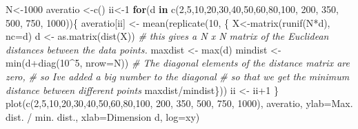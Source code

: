 \documentclass[
]{book}
\newenvironment{Shaded}{\begin{snugshade}}{\end{snugshade}}
\newcommand{\AttributeTok}[1]{\textcolor[rgb]{0.77,0.63,0.00}{#1}}
\newcommand{\CommentTok}[1]{\textcolor[rgb]{0.56,0.35,0.01}{\textit{#1}}}
\newcommand{\ControlFlowTok}[1]{\textcolor[rgb]{0.13,0.29,0.53}{\textbf{#1}}}
\newcommand{\DecValTok}[1]{\textcolor[rgb]{0.00,0.00,0.81}{#1}}
\newcommand{\FunctionTok}[1]{\textcolor[rgb]{0.00,0.00,0.00}{#1}}
\newcommand{\NormalTok}[1]{#1}
\newcommand{\OtherTok}[1]{\textcolor[rgb]{0.56,0.35,0.01}{#1}}
\newcommand{\SpecialCharTok}[1]{\textcolor[rgb]{0.00,0.00,0.00}{#1}}
\newcommand{\StringTok}[1]{\textcolor[rgb]{0.31,0.60,0.02}{#1}}
\theoremstyle{definition}
\theoremstyle{definition}
\theoremstyle{definition}
\theoremstyle{definition}
\theoremstyle{remark}
\begin{document}
\begin{Shaded}
\begin{Highlighting}[]
\NormalTok{N}\OtherTok{\textless{}{-}}\DecValTok{1000}
\NormalTok{averatio }\OtherTok{\textless{}{-}}\FunctionTok{c}\NormalTok{()}
\NormalTok{ii}\OtherTok{\textless{}{-}}\DecValTok{1}
\ControlFlowTok{for}\NormalTok{(d }\ControlFlowTok{in} \FunctionTok{c}\NormalTok{(}\DecValTok{2}\NormalTok{,}\DecValTok{5}\NormalTok{,}\DecValTok{10}\NormalTok{,}\DecValTok{20}\NormalTok{,}\DecValTok{30}\NormalTok{,}\DecValTok{40}\NormalTok{,}\DecValTok{50}\NormalTok{,}\DecValTok{60}\NormalTok{,}\DecValTok{80}\NormalTok{,}\DecValTok{100}\NormalTok{, }\DecValTok{200}\NormalTok{, }\DecValTok{350}\NormalTok{, }\DecValTok{500}\NormalTok{, }\DecValTok{750}\NormalTok{, }\DecValTok{1000}\NormalTok{))\{}
\NormalTok{  averatio[ii] }\OtherTok{\textless{}{-}} \FunctionTok{mean}\NormalTok{(}\FunctionTok{replicate}\NormalTok{(}\DecValTok{10}\NormalTok{, \{}
\NormalTok{  X}\OtherTok{\textless{}{-}}\FunctionTok{matrix}\NormalTok{(}\FunctionTok{runif}\NormalTok{(N}\SpecialCharTok{*}\NormalTok{d), }\AttributeTok{nc=}\NormalTok{d)}
\NormalTok{  d }\OtherTok{\textless{}{-}} \FunctionTok{as.matrix}\NormalTok{(}\FunctionTok{dist}\NormalTok{(X)) }
  \CommentTok{\# this gives a N x N matrix of the Euclidean distances between the data points.}
\NormalTok{  maxdist }\OtherTok{\textless{}{-}} \FunctionTok{max}\NormalTok{(d) }
\NormalTok{  mindist }\OtherTok{\textless{}{-}} \FunctionTok{min}\NormalTok{(d}\SpecialCharTok{+}\FunctionTok{diag}\NormalTok{(}\DecValTok{10}\SpecialCharTok{\^{}}\DecValTok{5}\NormalTok{, }\AttributeTok{nrow=}\NormalTok{N)) }
  \CommentTok{\# The diagonal elements of the distance matrix are zero,}
  \CommentTok{\# so I\textquotesingle{}ve added a big number to the diagonal }
  \CommentTok{\# so that we get the minimum distance between different points}
\NormalTok{  maxdist}\SpecialCharTok{/}\NormalTok{mindist\}))}
\NormalTok{  ii }\OtherTok{\textless{}{-}}\NormalTok{ ii}\SpecialCharTok{+}\DecValTok{1}
\NormalTok{\}}
\FunctionTok{plot}\NormalTok{(}\FunctionTok{c}\NormalTok{(}\DecValTok{2}\NormalTok{,}\DecValTok{5}\NormalTok{,}\DecValTok{10}\NormalTok{,}\DecValTok{20}\NormalTok{,}\DecValTok{30}\NormalTok{,}\DecValTok{40}\NormalTok{,}\DecValTok{50}\NormalTok{,}\DecValTok{60}\NormalTok{,}\DecValTok{80}\NormalTok{,}\DecValTok{100}\NormalTok{, }\DecValTok{200}\NormalTok{, }\DecValTok{350}\NormalTok{, }\DecValTok{500}\NormalTok{, }\DecValTok{750}\NormalTok{, }\DecValTok{1000}\NormalTok{), }
\NormalTok{     averatio, }\AttributeTok{ylab=}\StringTok{\textquotesingle{}Max. dist. / min. dist.\textquotesingle{}}\NormalTok{, }\AttributeTok{xlab=}\StringTok{\textquotesingle{}Dimension d\textquotesingle{}}\NormalTok{, }\AttributeTok{log=}\StringTok{\textquotesingle{}xy\textquotesingle{}}\NormalTok{)}
\end{Highlighting}
\end{Shaded}
\end{document}
